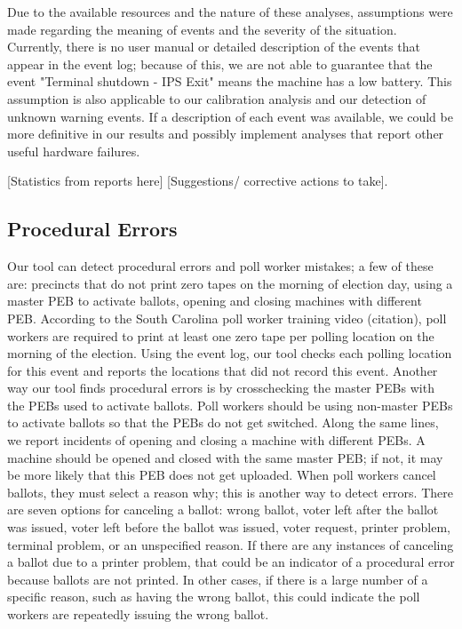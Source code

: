 Due to the available resources and the nature of these analyses, assumptions were made regarding the meaning of events and the severity of the situation.  Currently, there is no user manual or detailed description of the events that appear in the event log; because of this, we are not able to guarantee that the event "Terminal shutdown - IPS Exit" means the machine has a low battery.  This assumption is also applicable to our calibration analysis and our detection of unknown warning events.  If a description of each event was available, we could be more definitive in our results and possibly implement analyses that report other useful hardware failures.  

[Statistics from reports here] [Suggestions/ corrective actions to take].  

\subsection{Procedural Errors}
Our tool can detect procedural errors and poll worker mistakes; a few of these are: precincts that do not print zero tapes on the morning of election day, using a master PEB to activate ballots, opening and closing machines with different PEB.  According to the South Carolina poll worker training video (citation), poll workers are required to print at least one zero tape per polling location on the morning of the election.  Using the event log, our tool checks each polling location for this event and reports the locations that did not record this event.  Another way our tool finds procedural errors is by crosschecking the master PEBs with the PEBs used to activate ballots.  Poll workers should be using non-master PEBs to activate ballots so that the PEBs do not get switched.  Along the same lines, we report incidents of opening and closing a machine with different PEBs.  A machine should be opened and closed with the same master PEB; if not, it may be more likely that this PEB does not get uploaded.   When poll workers cancel ballots, they must select a reason why; this is another way to detect errors.  There are seven options for canceling a ballot: wrong ballot, voter left after the ballot was issued, voter left before the ballot was issued, voter request, printer problem, terminal problem, or an unspecified reason.  If there are any instances of canceling a ballot due to a printer problem, that could be an indicator of a procedural error because ballots are not printed.  In other cases, if there is a large number of a specific reason, such as having the wrong ballot, this could indicate the poll workers are repeatedly issuing the wrong ballot.  

